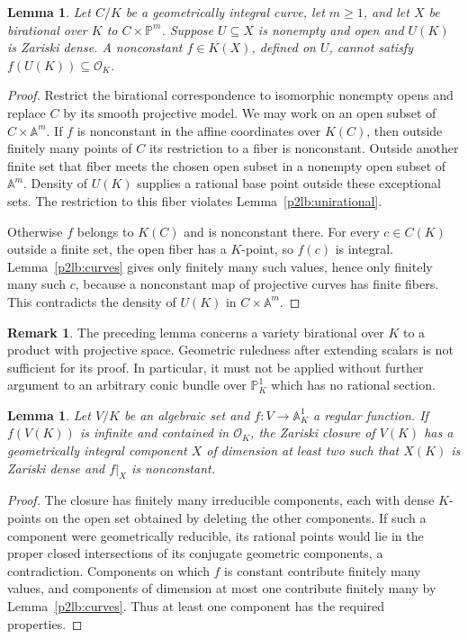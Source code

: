 \documentclass[11pt]{article}
\newtheorem{lemma}[theorem]{Lemma}
\theoremstyle{definition}
\newtheorem{remark}[theorem]{Remark}
\begin{document}
\begin{lemma}\label{p2lb:ruled}
Let $C/K$ be a geometrically integral curve, let $m\geq1$, and let
$X$ be birational over $K$ to $C\times\mathbb P^m$.
Suppose $U\subseteq X$ is nonempty and open and $U(K)$ is Zariski
dense.  A nonconstant $f\in K(X)$, defined on $U$, cannot satisfy
$f(U(K))\subseteq\mathcal O_K$.
\end{lemma}
\begin{proof}
Restrict the birational correspondence to isomorphic nonempty opens
and replace $C$ by its smooth projective model.  We may work on an
open subset of $C\times\mathbb A^m$.  If $f$ is nonconstant in the
affine coordinates over $K(C)$, then outside finitely many points of
$C$ its restriction to a fiber is nonconstant.  Outside another finite
set that fiber meets the chosen open subset in a nonempty open subset
of $\mathbb A^m$.  Density of $U(K)$ supplies a rational base point
outside these exceptional sets.  The restriction to this fiber violates
Lemma~\ref{p2lb:unirational}.

Otherwise $f$ belongs to $K(C)$ and is nonconstant there.  For every
$c\in C(K)$ outside a finite set, the open fiber has a $K$-point,
so $f(c)$ is integral.  Lemma~\ref{p2lb:curves} gives only finitely
many such values, hence only finitely many such $c$, because a
nonconstant map of projective curves has finite fibers.  This
contradicts the density of $U(K)$ in $C\times\mathbb A^m$.
\end{proof}

\begin{remark}
The preceding lemma concerns a variety birational over $K$ to a
product with projective space.  Geometric ruledness after extending
scalars is not sufficient for its proof.  In particular, it must not
be applied without further argument to an arbitrary conic bundle
over $\mathbb P^1_K$ which has no rational section.
\end{remark}

\begin{lemma}\label{p2lb:dense-component}
Let $V/K$ be an algebraic set and $f:V\to\mathbb A^1_K$ a regular
function.  If $f(V(K))$ is infinite and contained in $\mathcal O_K$,
the Zariski closure of $V(K)$ has a geometrically integral component
$X$ of dimension at least two such that $X(K)$ is Zariski dense
and $f|_X$ is nonconstant.
\end{lemma}
\begin{proof}
The closure has finitely many irreducible components, each with dense
$K$-points on the open set obtained by deleting the other components.
If such a component were geometrically reducible, its rational points
would lie in the proper closed intersections of its conjugate
geometric components, a contradiction.  Components on which $f$ is
constant contribute finitely many values, and components of dimension
at most one contribute finitely many by Lemma~\ref{p2lb:curves}.
Thus at least one component has the required properties.
\end{proof}
\end{document}
